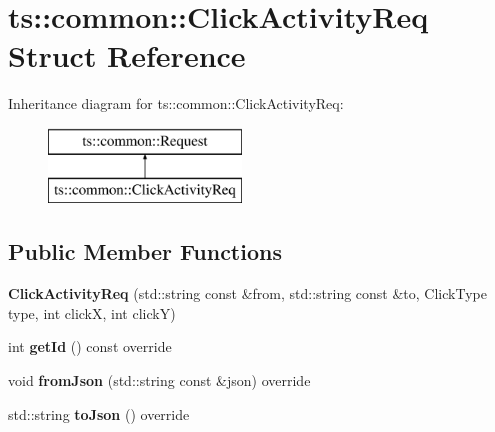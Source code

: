 \hypertarget{structts_1_1common_1_1_click_activity_req}{}\section{ts\+:\+:common\+:\+:Click\+Activity\+Req Struct Reference}
\label{structts_1_1common_1_1_click_activity_req}
Inheritance diagram for ts\+:\+:common\+:\+:Click\+Activity\+Req\+:\begin{figure}[H]
\begin{center}
\leavevmode
\includegraphics[height=2.000000cm]{structts_1_1common_1_1_click_activity_req}
\end{center}
\end{figure}
\subsection*{Public Member Functions}
\begin{DoxyCompactItemize}
\item 
\mbox{\label{structts_1_1common_1_1_click_activity_req_aa5807c63f2ae8390684bdfa493d82116}} 
{\bfseries Click\+Activity\+Req} (std\+::string const \&from, std\+::string const \&to, Click\+Type type, int clickX, int clickY)
\item 
\mbox{\label{structts_1_1common_1_1_click_activity_req_af6cfec5d4a169be3e72853c7c5ba53a8}} 
int {\bfseries get\+Id} () const override
\item 
\mbox{\label{structts_1_1common_1_1_click_activity_req_adddea5af0019044379a7dc166a11a25f}} 
void {\bfseries from\+Json} (std\+::string const \&json) override
\item 
\mbox{\label{structts_1_1common_1_1_click_activity_req_a67f4c080ad3266f205a7bf1d064c456c}} 
std\+::string {\bfseries to\+Json} () override
\end{DoxyCompactItemize}
